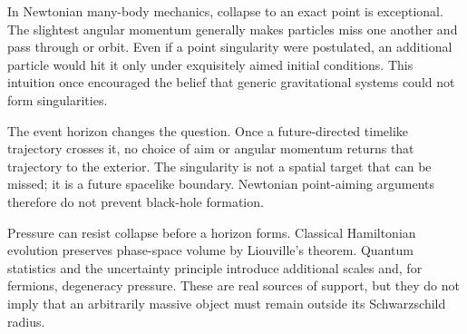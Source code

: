 In Newtonian many-body mechanics, collapse to an exact point is
exceptional.  The slightest angular momentum generally makes
particles miss one another and pass through or orbit.  Even if a
point singularity were postulated, an additional particle would hit
it only under exquisitely aimed initial conditions.  This intuition
once encouraged the belief that generic gravitational systems could
not form singularities.

The event horizon changes the question.  Once a future-directed
timelike trajectory crosses it, no choice of aim or angular momentum
returns that trajectory to the exterior.  The singularity is not a
spatial target that can be missed; it is a future spacelike boundary.
Newtonian point-aiming arguments therefore do not prevent black-hole
formation.

\begin{classroomqa}
\end{classroomqa}

Pressure can resist collapse before a horizon forms.  Classical
Hamiltonian evolution preserves phase-space volume by Liouville's
theorem.  Quantum statistics and the uncertainty principle introduce
additional scales and, for fermions, degeneracy pressure.  These are
real sources of support, but they do not imply that an arbitrarily
massive object must remain outside its Schwarzschild radius.

\begin{classroomqa}
\end{classroomqa}

